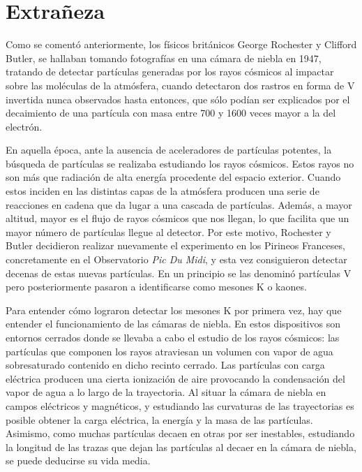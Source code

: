 \chapter{Extrañeza}\label{cap:strangeness}

Como se comentó anteriormente, los físicos británicos George Rochester y Clifford Butler, se hallaban tomando fotografías en una cámara de niebla en 1947, tratando de detectar partículas generadas por los rayos cósmicos al impactar sobre las moléculas de la atmósfera, cuando detectaron dos rastros en forma de V invertida nunca observados hasta entonces, que sólo podían ser explicados por el decaimiento de una partícula con masa entre 700 y 1600 veces mayor a la del electrón. 

En aquella época, ante la ausencia de aceleradores de partículas potentes, la búsqueda de partículas se realizaba estudiando los rayos cósmicos. Estos rayos no son más que radiación de alta energía procedente del espacio exterior. Cuando estos inciden en las distintas capas de la atmósfera producen una serie de reacciones en cadena que da lugar a una cascada de partículas. Además, a mayor altitud, mayor es el flujo de rayos cósmicos que nos llegan, lo que facilita que un mayor número de partículas llegue al detector. Por este motivo, Rochester y Butler decidieron realizar nuevamente el experimento en los Pirineos Franceses, concretamente en el Observatorio \textit{Pic Du Midi}, y esta vez consiguieron detectar decenas de estas nuevas partículas. En un principio se las denominó partículas V pero posteriormente pasaron a identificarse como mesones K o kaones.

Para entender cómo lograron detectar los mesones K por primera vez, hay que entender el funcionamiento de las cámaras de niebla. En estos dispositivos son entornos cerrados donde se llevaba a cabo el estudio de los rayos cósmicos: las partículas que componen los rayos atraviesan un volumen con vapor de agua sobresaturado contenido en dicho recinto cerrado. Las partículas con carga eléctrica producen una cierta ionización de aire provocando la condensación del vapor de agua a lo largo de la trayectoria.  Al situar la cámara de niebla en campos eléctricos y magnéticos, y estudiando las curvaturas de las trayectorias es posible obtener la carga eléctrica, la energía y la masa de las partículas.  Asimismo, como muchas partículas decaen en otras por ser inestables, estudiando la longitud de las trazas que dejan las partículas al decaer en la cámara de niebla, se puede deducirse su vida media. \cite{notas2020}\\

